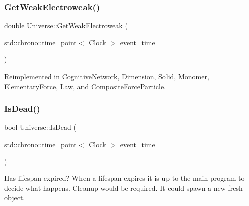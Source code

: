 \mbox{\label{classUniverse_a645299738e6b798a037f2a15a2e7cf4d}} 
\subsubsection{\texorpdfstring{Get\+Weak\+Electroweak()}{GetWeakElectroweak()}}
{\footnotesize\ttfamily double Universe\+::\+Get\+Weak\+Electroweak (\begin{DoxyParamCaption}\item[{std\+::chrono\+::time\+\_\+point$<$ \mbox{\hyperlink{universe_8h_a0ef8d951d1ca5ab3cfaf7ab4c7a6fd80}{Clock}} $>$}]{event\+\_\+time }\end{DoxyParamCaption})\hspace{0.3cm}{\ttfamily [virtual]}}



Reimplemented in \mbox{\hyperlink{classCognitiveNetwork_aa6342c390fe8e7c648b4c6bc8f93ba4a}{Cognitive\+Network}}, \mbox{\hyperlink{classDimension_a5bb5a164564013a60728854cc2e5ddb3}{Dimension}}, \mbox{\hyperlink{classSolid_ac98f9c827d58a631627423e25dd611ba}{Solid}}, \mbox{\hyperlink{classMonomer_aec6e42dde40c5b3142fab880eabb346a}{Monomer}}, \mbox{\hyperlink{classElementaryForce_a928e06a1fa81b8d7ec4a426d959a0f98}{Elementary\+Force}}, \mbox{\hyperlink{classLaw_aad6e54da64a5d8499dcb6c232aa6748f}{Law}}, and \mbox{\hyperlink{classCompositeForceParticle_a27762218af4e3c021c89ff4792d81b41}{Composite\+Force\+Particle}}.

\mbox{\label{classUniverse_a8fdaa6d06584e1ef50c4c613b22b786e}} 
\subsubsection{\texorpdfstring{Is\+Dead()}{IsDead()}}
{\footnotesize\ttfamily bool Universe\+::\+Is\+Dead (\begin{DoxyParamCaption}\item[{std\+::chrono\+::time\+\_\+point$<$ \mbox{\hyperlink{universe_8h_a0ef8d951d1ca5ab3cfaf7ab4c7a6fd80}{Clock}} $>$}]{event\+\_\+time }\end{DoxyParamCaption})}

Has lifespan expired? When a lifespan expires it is up to the main program to decide what happens. Cleanup would be required. It could spawn a new fresh object.\mbox{\label{classUniverse_a0c485c504542409cbb5cfd8543c35b11}} 
